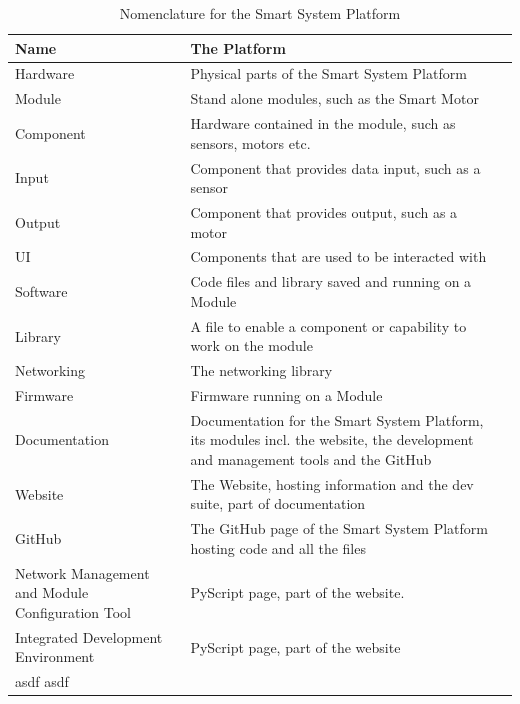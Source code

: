 \begin{table}[H]
    \centering
    \begin{tabular}{|pp{50pt}|p{300pt}|}
    \hline
        Name & The Platform \\\hline
        Hardware        & Physical parts of the Smart System Platform \\\hline
        Module          & Stand alone modules, such as the Smart Motor \\\hline
        Component       & Hardware contained in the module, such as sensors, motors etc. \\\hline
        Input           & Component that provides data input, such as a sensor \\\hline
        Output          & Component that provides output, such as a motor \\\hline
        UI              & Components that are used to be interacted with  \\\hline
        Software        & Code files and library saved and running on a Module \\\hline
        Library         & A file to enable a component or capability to work on the module \\\hline
        Networking      & The networking library \\\hline
        Firmware        & Firmware running on a Module \\\hline
        Documentation   & Documentation for the Smart System Platform, its modules incl. the website, the development and management tools and the GitHub \\\hline
        Website         & The Website, hosting information and the dev suite, part of documentation \\\hline
        GitHub          & The GitHub page of the Smart System Platform hosting code and all the files \\\hline
        Network Management and Module Configuration Tool   & PyScript page, part of the website. \\\hline
        Integrated Development Environment                  & PyScript page, part of the website \\\hline
        asdf
        asdf
    \end{tabular}
    \vspace{\ftspace}
    \caption{Nomenclature for the Smart System Platform}
    \label{tab:nomenclature}
\end{table}


